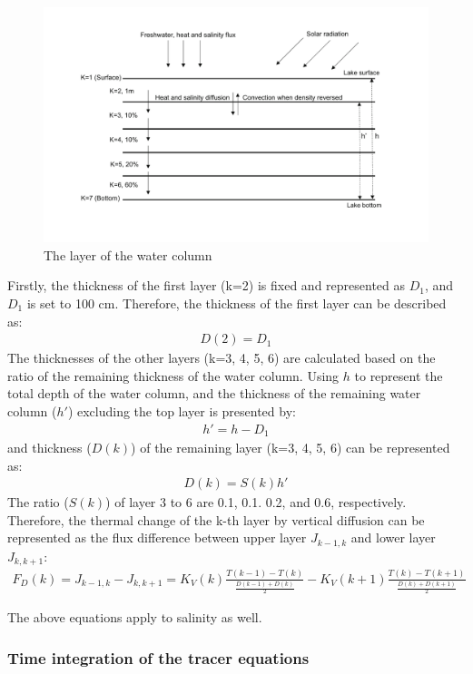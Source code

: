 \begin{figure}
\centering
\includegraphics{descript/Lake_11-1.pdf}
\caption{The layer of the water column}
\end{figure}

Firstly, the thickness of the first layer (k=2) is fixed and represented as \(D_{1}\), and \(D_{1}\) is set to 100 cm. Therefore, the thickness of the first layer can be described as: \begin{eqnarray}
D(2)=D_{1}
\end{eqnarray} The thicknesses of the other layers (k=3, 4, 5, 6) are calculated based on the ratio of the remaining thickness of the water column. Using \(h\) to represent the total depth of the water column,
and the thickness of the remaining water column (\(h'\)) excluding the top layer is presented by: \begin{eqnarray}
h'=h-D_{1}
\end{eqnarray} and thickness (\(D(k)\)) of the remaining layer (k=3, 4, 5, 6) can be represented as: \begin{eqnarray}
D(k)=S(k)h'
\end{eqnarray} The ratio (\(S(k)\)) of layer 3 to 6 are 0.1, 0.1. 0.2, and 0.6, respectively. Therefore, the thermal change of the k-th layer by vertical diffusion can be represented as the flux difference
between upper layer \(J_{k-1, k}\) and lower layer \(J_{k, k+1}\): \begin{eqnarray}
F_{D}(k)=J_{k-1,k}-J_{k,k+1}=K_{V}(k)\frac{T(k-1)-T(k)}{\frac{D(k-1)+D(k)}{2}}-K_{V}(k+1)\frac{T(k)-T(k+1)}{\frac{D(k)+D(k+1)}{2}}
\end{eqnarray}

The above equations apply to salinity as well.

\subsubsection{Time integration of the tracer equations}\label{time-integration-of-the-tracer-equations}

